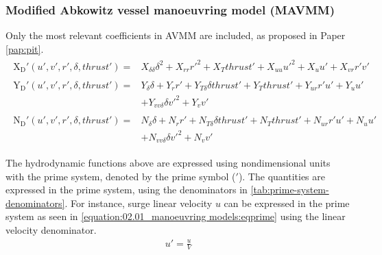 \subsubsection*{\normalfont \textbf{Modified Abkowitz vessel manoeuvring model (MAVMM)}}
\newline
Only the most relevant coefficients in AVMM are included, as proposed in Paper \ref{pap:pit}.
\begin{equation}\label{equation:02.01_manoeuvring models:eqxmartinssimple}
\begin{split}\begin{split}
\operatorname{X_{D}'}{\left(u',v',r',\delta,thrust' \right)} = & X_{\delta\delta} \delta^{2} + X_{rr} r'^{2} + X_{T} thrust' + X_{uu} u'^{2} + X_{u} u' + X_{vr} r' v' 
\end{split}\end{split}
\end{equation}\begin{equation}\label{equation:02.01_manoeuvring models:eqymartinssimple}
\begin{split}\begin{split}
\operatorname{Y_{D}'}{\left(u',v',r',\delta,thrust' \right)} = & Y_{\delta} \delta + Y_{r} r' + Y_{T\delta} \delta thrust' + Y_{T} thrust' + Y_{ur} r' u' + Y_{u} u' \\ & + Y_{vv\delta} \delta v'^{2} + Y_{v} v' 
\end{split}\end{split}
\end{equation}\begin{equation}\label{equation:02.01_manoeuvring models:eqnmartinssimple}
\begin{split}\begin{split}
\operatorname{N_{D}'}{\left(u',v',r',\delta,thrust' \right)} = & N_{\delta} \delta + N_{r} r' + N_{T\delta} \delta thrust' + N_{T} thrust' + N_{ur} r' u' + N_{u} u' \\ & + N_{vv\delta} \delta v'^{2} + N_{v} v' 
\end{split}\end{split}
\end{equation}

The hydrodynamic functions above are expressed using nondimensional units with the prime system, denoted by the prime symbol (\('\)). The quantities are expressed in the prime system, using the denominators in \autoref{tab:prime-system-denominators}. For instance, surge linear velocity \(u\) can be expressed in the prime system as seen in \autoref{equation:02.01_manoeuvring models:eqprime} using the linear velocity denominator.
\begin{equation}\label{equation:02.01_manoeuvring models:eqprime}
\begin{split}\displaystyle u'=\frac{u}{V}\end{split}
\end{equation}

